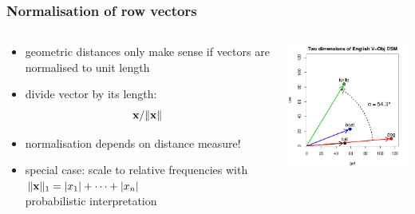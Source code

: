 \documentclass[t]{beamer} %
\begin{document}
\begin{frame}[c]
  \frametitle{Normalisation of row vectors}
  
  \begin{columns}[c]
    \begin{column}{5.5cm}
      \begin{itemize}
      \item geometric distances only make sense if vectors are normalised to unit length
      \item divide vector by its length: \[ \vx / \norm{\vx} \]
      \item normalisation depends on distance measure!
      \item special case: scale to relative frequencies with
        $\norm[1]{\vx} = \abs{x_1} + \dots + \abs{x_n}$\\
        \so probabilistic interpretation
      \end{itemize}
    \end{column}
    \begin{column}{6cm}
      \includegraphics[width=6cm]{img/hieroglyph_2d_4}
    \end{column}
  \end{columns}
\end{frame}
\end{document}

